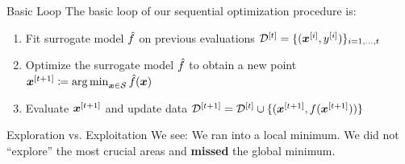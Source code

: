 \documentclass[11pt,compress,t,notes=noshow, xcolor=table]{beamer}
\begin{document}
\begin{framev}{Basic Loop}
The basic loop of our sequential optimization procedure is:
\begin{enumerate}
\item Fit surrogate model $\hat{f}$ on previous evaluations $\mathcal{D}^{[t]} = \{(\bm{x}^{[i]}, y^{[i]})\}_{i = 1, \ldots, t}$
\item Optimize the surrogate model $\hat{f}$ to obtain a new point $\bm{x}^{[t+1]} \coloneqq \mathop{\mathrm{arg\,min}}_{\bm{x} \in \mathcal{S}} \hat{f}(\bm{x})$
\item Evaluate $\bm{x}^{[t+1]}$ and update data $\mathcal{D}^{[t+1]} = \mathcal{D}^{[t]} \cup \{(\bm{x}^{[t+1]}, f(\bm{x}^{[t+1]}))\}$
\end{enumerate}
\end{framev}


\begin{framev}{Exploration vs. Exploitation}
We see: We ran into a local minimum. We did not \enquote{explore} the most crucial areas and \textbf{missed} the global minimum.
\vfill
{}
\end{framev}

\endlecture
\end{document}
